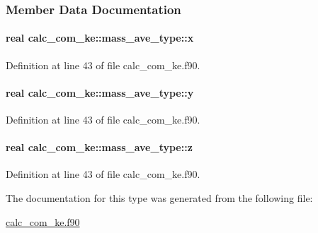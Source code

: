 \subsubsection{Member Data Documentation}
\hypertarget{structcalc__com__ke_1_1mass__ave__type_ace118ced51b2035cd33acabc4815ece7}{
\paragraph[{x}]{\setlength{\rightskip}{0pt plus 5cm}real calc\-\_\-com\-\_\-ke\-::mass\-\_\-ave\-\_\-type\-::x}}\label{structcalc__com__ke_1_1mass__ave__type_ace118ced51b2035cd33acabc4815ece7}


Definition at line 43 of file calc\-\_\-com\-\_\-ke.\-f90.

\hypertarget{structcalc__com__ke_1_1mass__ave__type_aedc065f446af5e778bab2a0cdee453de}{
\paragraph[{y}]{\setlength{\rightskip}{0pt plus 5cm}real calc\-\_\-com\-\_\-ke\-::mass\-\_\-ave\-\_\-type\-::y}}\label{structcalc__com__ke_1_1mass__ave__type_aedc065f446af5e778bab2a0cdee453de}


Definition at line 43 of file calc\-\_\-com\-\_\-ke.\-f90.

\hypertarget{structcalc__com__ke_1_1mass__ave__type_a6817c41a4ce0d0f145edbab090ae72fb}{
\paragraph[{z}]{\setlength{\rightskip}{0pt plus 5cm}real calc\-\_\-com\-\_\-ke\-::mass\-\_\-ave\-\_\-type\-::z}}\label{structcalc__com__ke_1_1mass__ave__type_a6817c41a4ce0d0f145edbab090ae72fb}


Definition at line 43 of file calc\-\_\-com\-\_\-ke.\-f90.



The documentation for this type was generated from the following file\-:\begin{DoxyCompactItemize}
\item 
\hyperlink{calc__com__ke_8f90}{calc\-\_\-com\-\_\-ke.\-f90}\end{DoxyCompactItemize}
